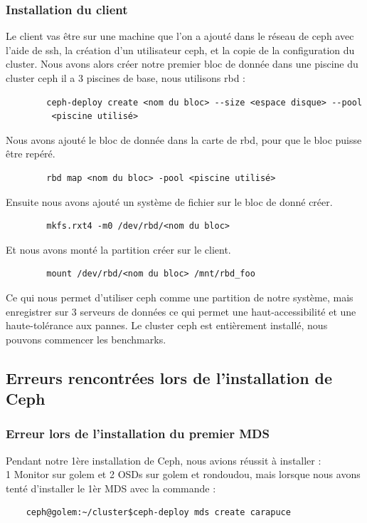 \documentclass[12pt]{article}
\begin{document}
	  	\subsubsection{Installation du client}
	  	Le client vas être sur une machine que l'on a ajouté dans le réseau de ceph avec l'aide de ssh, la création d'un utilisateur ceph, et la copie de la configuration du cluster.
	  	Nous avons alors créer notre premier bloc de donnée dans une piscine du cluster ceph il a 3 piscines de base, nous utilisons rbd :
	  	\begin{verbatim}
	  	ceph-deploy create <nom du bloc> --size <espace disque> --pool
	  	 <piscine utilisé>
	  	\end{verbatim}
	  	Nous avons ajouté le bloc de donnée dans la carte de rbd, pour que le bloc puisse être repéré.
	  	\begin{verbatim}
	  	rbd map <nom du bloc> -pool <piscine utilisé>
	  	\end{verbatim}
	  	Ensuite nous avons ajouté un système de fichier sur le bloc de donné créer.
	  	\begin{verbatim}
	  	mkfs.rxt4 -m0 /dev/rbd/<nom du bloc>
	  	\end{verbatim}
	  	Et nous avons monté la partition créer sur le client.
	  	\begin{verbatim}
	  	mount /dev/rbd/<nom du bloc> /mnt/rbd_foo
	  	\end{verbatim}
	  	Ce qui nous permet d'utiliser ceph comme une partition de notre système, mais enregistrer sur 3 serveurs de données ce qui permet une haut-accessibilité et une haute-tolérance aux pannes.
	  	Le cluster ceph est entièrement installé, nous pouvons commencer les benchmarks.
	\subsection{Erreurs rencontrées lors de l'installation de Ceph}
	\subsubsection{Erreur lors de l'installation du premier MDS}
	Pendant notre 1ère installation de Ceph, nous avions réussit à installer :
	\\ 1 Monitor sur golem et 2 OSDs sur golem et rondoudou, mais lorsque nous avons tenté d'installer le 1èr MDS avec la commande :
	\begin{verbatim}
	ceph@golem:~/cluster$ceph-deploy mds create carapuce
	\end{verbatim}
	
\end{document}

